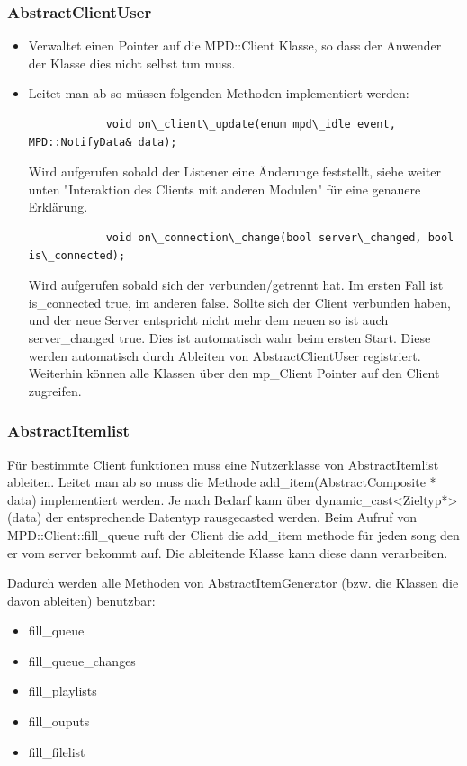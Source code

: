 \subsubsection{AbstractClientUser}
\begin{itemize}
    \item Verwaltet einen Pointer auf die MPD::Client Klasse,
        so dass der Anwender der Klasse dies nicht selbst tun muss.
    \item Leitet man ab so müssen folgenden Methoden implementiert werden:
        \begin{verbatim}
            void on\_client\_update(enum mpd\_idle event, MPD::NotifyData& data);
        \end{verbatim}  

        Wird aufgerufen sobald der Listener eine Änderunge feststellt,
        siehe weiter unten "Interaktion des Clients mit anderen Modulen" für eine genauere Erklärung.
        \begin{verbatim}
            void on\_connection\_change(bool server\_changed, bool is\_connected);
        \end{verbatim}

        Wird aufgerufen sobald sich der verbunden/getrennt hat. Im ersten Fall
        ist is\_connected true, im anderen false. Sollte sich der Client verbunden haben,
        und der neue Server entspricht nicht mehr dem neuen so ist auch server\_changed true.
        Dies ist automatisch wahr beim ersten Start.
        Diese werden automatisch durch Ableiten von AbstractClientUser registriert.
        Weiterhin können alle Klassen über den mp\_Client Pointer auf den Client zugreifen.
\end{itemize}


\subsubsection{AbstractItemlist}
Für bestimmte Client funktionen muss eine Nutzerklasse von AbstractItemlist ableiten.
Leitet man ab so muss die Methode add\_item(AbstractComposite * data) implementiert werden. 
Je nach Bedarf kann über dynamic\_cast<Zieltyp*>(data) der entsprechende Datentyp rausgecasted werden.
Beim Aufruf von MPD::Client::fill\_queue ruft der Client die add\_item methode für jeden 
song den er vom server bekommt auf. Die ableitende Klasse kann diese dann verarbeiten.

Dadurch werden alle Methoden von AbstractItemGenerator (bzw. die Klassen die davon ableiten) benutzbar:
\begin{itemize}
    \item fill\_queue
    \item fill\_queue\_changes
    \item fill\_playlists
    \item fill\_ouputs
    \item fill\_filelist
\end{itemize} 

